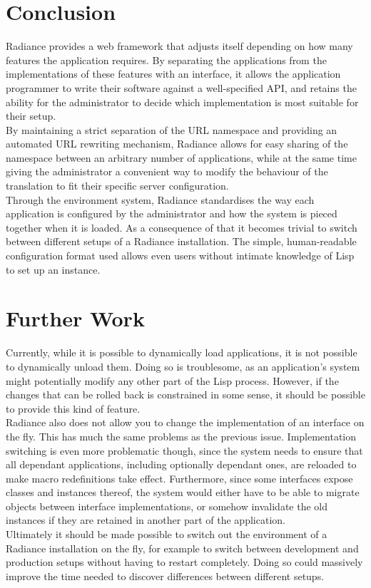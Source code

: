 \documentclass{sig-alternate}
\begin{document}
\section{Conclusion}
Radiance provides a web framework that adjusts itself depending on how many features the application requires. By separating the applications from the implementations of these features with an interface, it allows the application programmer to write their software against a well-specified API, and retains the ability for the administrator to decide which implementation is most suitable for their setup. \\

By maintaining a strict separation of the URL namespace and providing an automated URL rewriting mechanism, Radiance allows for easy sharing of the namespace between an arbitrary number of applications, while at the same time giving the administrator a convenient way to modify the behaviour of the translation to fit their specific server configuration. \\

Through the environment system, Radiance standardises the way each application is configured by the administrator and how the system is pieced together when it is loaded. As a consequence of that it becomes trivial to switch between different setups of a Radiance installation. The simple, human-readable configuration format used allows even users without intimate knowledge of Lisp to set up an instance.

\section{Further Work}
Currently, while it is possible to dynamically load applications, it is not possible to dynamically unload them. Doing so is troublesome, as an application's system might potentially modify any other part of the Lisp process. However, if the changes that can be rolled back is constrained in some sense, it should be possible to provide this kind of feature. \\

Radiance also does not allow you to change the implementation of an interface on the fly. This has much the same problems as the previous issue. Implementation switching is even more problematic though, since the system needs to ensure that all dependant applications, including optionally dependant ones, are reloaded to make macro redefinitions take effect. Furthermore, since some interfaces expose classes and instances thereof, the system would either have to be able to migrate objects between interface implementations, or somehow invalidate the old instances if they are retained in another part of the application. \\

Ultimately it should be made possible to switch out the environment of a Radiance installation on the fly, for example to switch between development and production setups without having to restart completely. Doing so could massively improve the time needed to discover differences between different setups.


\end{document}
